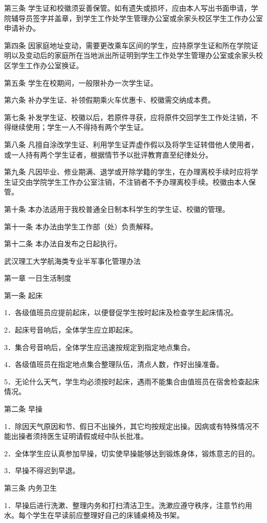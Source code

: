 \documentclass[UTF8,12pt,a4paper]{report}
\begin{document}
第三条 学生证和校徽须妥善保管。如有遗失或损坏，应由本人写出书面申请，学院辅导员签字并盖章，到学生工作处学生管理办公室或余家头校区学生工作办公室申请补办。

第四条 因家庭地址变动，需要更改乘车区间的学生，应持原学生证和所在学院证明以及变动后的家庭所在当地派出所证明到学生工作处学生管理办公室或余家头校区学生工作办公室换证。

第五条 学生在校期间，一般限补办一次学生证。

第六条 补办学生证、补领假期乘火车优惠卡、校徽需交纳成本费。

第七条 补发学生证、校徽以后，若原件寻获，应将原件交回学生工作处注销，不得继续使用；学生一人不得持有两个学生证。

第八条 凡擅自涂改学生证、利用学生证弄虚作假以及将学生证转借他人使用者，或一人持有两个学生证者，根据情节予以批评教育直至纪律处分。

第九条 凡因毕业、修业期满、退学或开除学籍的学生，在办理离校手续时应将学生证交由学院学生工作办公室注销，不注销者不予办理离校手续。校徽由本人保管。

第十条 本办法适用于我校普通全日制本科学生的学生证、校徽的管理。

第十一条 本办法由学生工作部（处）负责解释。

第十二条 本办法自发布之日起执行。



武汉理工大学航海类专业半军事化管理办法

第一章 一日生活制度

第一条 起床

1．各级值班员应提前起床，以便督促学生按时起床及检查学生起床情况。

2．起床号音响后，全体学生应立即起床。

3．集合号音响后，全体学生应迅速按规定到指定地点集合。

4．各级值班员在指定地点集合整理队伍，清点人数，作好出操准备。

5．无论什么天气，学生均必须按时起床，遇雨不能集合由值班员在宿舍检查起床情况。

第二条 早操

1．除因天气原因和节、假日不出操外，其它均按规定出操。因病或有特殊情况不能出操者须持医生证明请假或经中队长批准。

2．全体学生应认真参加早操，切实使早操能够达到锻炼身体，锻炼意志的目的。

3．早操不得迟到早退。

第三条 内务卫生

1．早操后进行洗漱、整理内务和打扫清洁卫生。洗漱应遵守秩序，注意节约用水。每个学生在早读前应整理好自己的床铺桌椅及书架。
\end{document}
